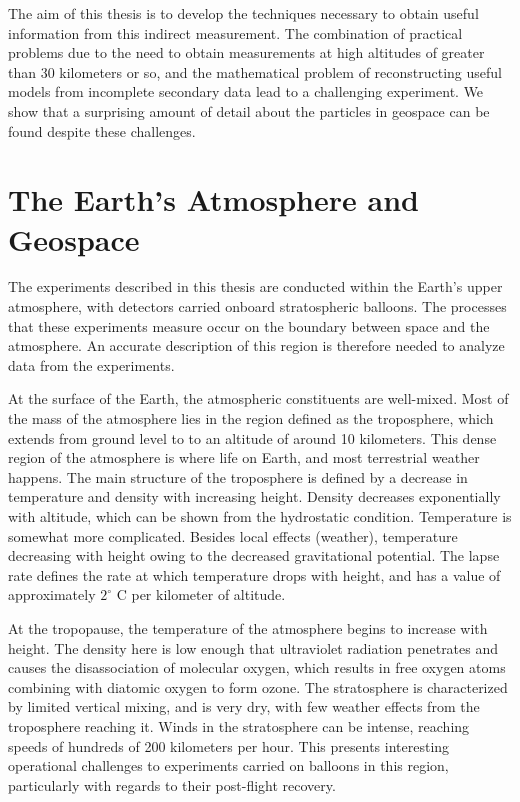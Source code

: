 The aim of this thesis is to develop the techniques necessary to obtain useful information from this indirect measurement. The combination of practical problems due to the need to obtain measurements at high altitudes of greater than 30 kilometers or so, and the mathematical problem of reconstructing useful models from incomplete secondary data lead to a challenging experiment. We show that a surprising amount of detail about the particles in geospace can be found despite these challenges.

\section{The Earth's Atmosphere and Geospace}

The experiments described in this thesis are conducted within the Earth's upper atmosphere, with detectors carried onboard stratospheric balloons. The processes that these experiments measure occur on the boundary between space and the atmosphere.  An accurate description of this region is therefore needed to analyze data from the experiments. 

At the surface of the Earth, the atmospheric constituents are well-mixed. Most of the mass of the atmosphere lies in the region defined as the troposphere, which extends from ground level to to an altitude of around 10 kilometers. This dense region of the atmosphere is where life on Earth, and most terrestrial weather happens. The main structure of the troposphere is defined by a decrease in temperature and density with increasing height. Density decreases exponentially with altitude, which can be shown from the hydrostatic condition. Temperature is somewhat more complicated. Besides local effects (weather), temperature decreasing with height owing to the decreased gravitational potential. The lapse rate defines the rate at which temperature drops with height, and has a value of approximately $2^{\circ}$  C per kilometer of altitude. 

At the tropopause, the temperature of the atmosphere begins to increase with height. The density here is low enough that ultraviolet radiation penetrates and causes the disassociation of molecular oxygen, which results in free oxygen atoms combining with diatomic oxygen to form ozone. The stratosphere is characterized by limited vertical mixing, and is very dry, with few weather effects from the troposphere reaching it. Winds in the stratosphere can be intense, reaching speeds of hundreds of 200 kilometers per hour. This presents interesting operational challenges to experiments carried on balloons in this region, particularly with regards to their post-flight recovery. 

